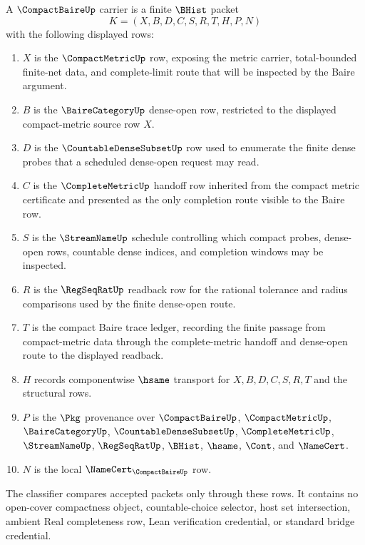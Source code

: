 \begin{definition}
\label{def:compact-baire-carrier}
A $\CompactBaireUp$ carrier is a finite $\BHist$ packet
$$
K=(X,B,D,C,S,R,T,H,P,N)
$$
with the following displayed rows:
\begin{enumerate}
\item $X$ is the $\CompactMetricUp$ row, exposing the metric carrier, total-bounded finite-net data, and complete-limit route that will be inspected by the Baire argument.
\item $B$ is the $\BaireCategoryUp$ dense-open row, restricted to the displayed compact-metric source row $X$.
\item $D$ is the $\CountableDenseSubsetUp$ row used to enumerate the finite dense probes that a scheduled dense-open request may read.
\item $C$ is the $\CompleteMetricUp$ handoff row inherited from the compact metric certificate and presented as the only completion route visible to the Baire row.
\item $S$ is the $\StreamNameUp$ schedule controlling which compact probes, dense-open rows, countable dense indices, and completion windows may be inspected.
\item $R$ is the $\RegSeqRatUp$ readback row for the rational tolerance and radius comparisons used by the finite dense-open route.
\item $T$ is the compact Baire trace ledger, recording the finite passage from compact-metric data through the complete-metric handoff and dense-open route to the displayed readback.
\item $H$ records componentwise $\hsame$ transport for $X,B,D,C,S,R,T$ and the structural rows.
\item $P$ is the $\Pkg$ provenance over $\CompactBaireUp$, $\CompactMetricUp$, $\BaireCategoryUp$, $\CountableDenseSubsetUp$, $\CompleteMetricUp$, $\StreamNameUp$, $\RegSeqRatUp$, $\BHist$, $\hsame$, $\Cont$, and $\NameCert$.
\item $N$ is the local $\NameCert_{\CompactBaireUp}$ row.
\end{enumerate}
The classifier compares accepted packets only through these rows. It contains no open-cover compactness object, countable-choice selector, host set intersection, ambient Real completeness row, Lean verification credential, or standard bridge credential.
\end{definition}

